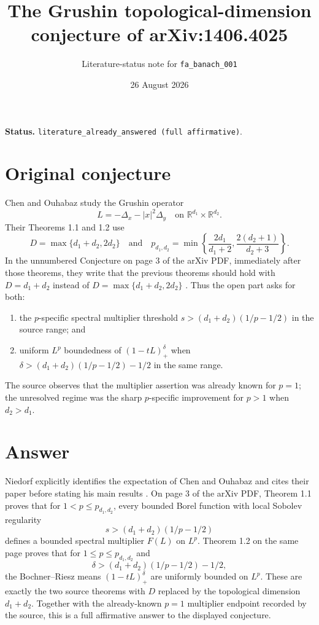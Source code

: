 \documentclass[11pt]{article}
\title{The Grushin topological-dimension conjecture of arXiv:1406.4025}
\author{Literature-status note for \texttt{fa\_banach\_001}}
\date{26 August 2026}
\newcommand{\pd}{p_{d_1,d_2}}
\begin{document}
\maketitle

\noindent\textbf{Status.}
\texttt{literature\_already\_answered (full affirmative)}.

\section*{Original conjecture}

Chen and Ouhabaz study the Grushin operator
\[
 L=-\Delta_x-|x|^2\Delta_y
 \quad\text{on }\mathbb R^{d_1}\times\mathbb R^{d_2}.
\]
Their Theorems 1.1 and 1.2 use
\[
 D=\max\{d_1+d_2,2d_2\}
 \quad\text{and}\quad
 \pd=\min\left\{\frac{2d_1}{d_1+2},
                    \frac{2(d_2+1)}{d_2+3}\right\}.
\]
In the unnumbered Conjecture on page 3 of the arXiv PDF, immediately after
those theorems, they write that the previous theorems should hold with
$D=d_1+d_2$ instead of $D=\max\{d_1+d_2,2d_2\}$ \cite{ChenOuhabaz}.
Thus the open part asks for both:
\begin{enumerate}
\item the $p$-specific spectral multiplier threshold
  $s>(d_1+d_2)(1/p-1/2)$ in the source range; and
\item uniform $L^p$ boundedness of $(1-tL)_+^\delta$ when
  $\delta>(d_1+d_2)(1/p-1/2)-1/2$ in the same range.
\end{enumerate}
The source observes that the multiplier assertion was already known for
$p=1$; the unresolved regime was the sharp $p$-specific improvement for
$p>1$ when $d_2>d_1$.

\section*{Answer}

Niedorf explicitly identifies the expectation of Chen and Ouhabaz and cites
their paper before stating his main results \cite{Niedorf}. On page 3 of the
arXiv PDF, Theorem 1.1 proves that for $1<p\leq\pd$, every bounded Borel
function with local Sobolev regularity
\[
 s>(d_1+d_2)(1/p-1/2)
\]
defines a bounded spectral multiplier $F(L)$ on $L^p$. Theorem 1.2 on the
same page proves that for $1\leq p\leq\pd$ and
\[
 \delta>(d_1+d_2)(1/p-1/2)-1/2,
\]
the Bochner--Riesz means $(1-tL)_+^\delta$ are uniformly bounded on $L^p$.
These are exactly the two source theorems with $D$ replaced by the
topological dimension $d_1+d_2$. Together with the already-known $p=1$
multiplier endpoint recorded by the source, this is a full affirmative answer
to the displayed conjecture.
\end{document}
